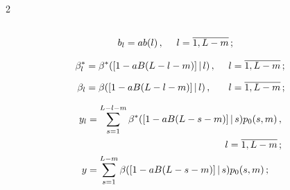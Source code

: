 \begin{multicols}{2}
\begin{alignat*}{2}
\\


b_l&=a b(l)\,,&\enskip l&=\overline{1,L-m}\,;


\end{alignat*}








\vspace*{-3pt}





\pagebreak





\noindent


\begin{alignat*}{2}


\beta^*_l&=\beta^*([1 - a B(L-l-m)]\,|\,l)\,,&\enskip l&=\overline{1,L-m}\,;


\\[6pt]


\beta_l&=\beta([1 - a B(L-l-m)]\,|\,l)\,,&\enskip l&=\overline{1,L-m}\,;


\end{alignat*}





\vspace*{-12pt}





\noindent


\begin{align*}


y_l&=\sum\limits_{s=1}^{L-l-m}\beta^*([1 - a B(L-s-m)]\,|\,s)


p_{0}(s,m)\,,\\[1pt]


&\hspace*{50mm}l=\overline{1,L-m}\,;\\


y&=\sum\limits_{s=1}^{L-m}\beta([1 - a B(L-s-m)]\,|\,s)p_{0}(s,m)\,;


\end{align*}





\vspace*{-12pt}





\noindent


\begin{multline*}



\end{multline*}
\end{multicols}
